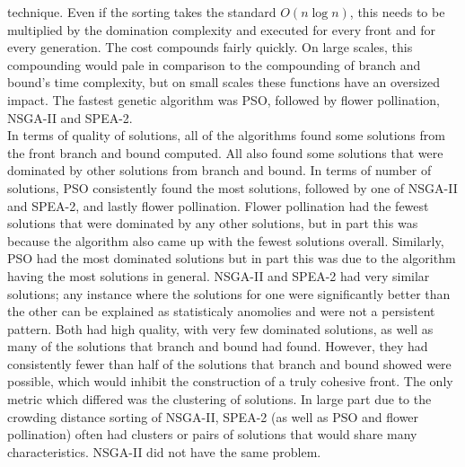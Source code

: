 \documentclass{article}
\begin{document}
    technique. Even if the sorting takes the standard \(O(n \log{n})\), this needs to be multiplied by the domination complexity and executed for every front and for 
    every generation. The cost compounds fairly quickly. On large scales, this compounding would pale in comparison to the compounding of branch and bound's time
    complexity, but on small scales these functions have an oversized impact. The fastest genetic algorithm was PSO, followed by flower pollination, NSGA-II and SPEA-2.\\
    In terms of quality of solutions, all of the algorithms found some solutions from the front branch and bound computed. All also found some solutions that were 
    dominated by other solutions from branch and bound. In terms of number of solutions, PSO consistently found the most solutions, followed by one of NSGA-II and
    SPEA-2, and lastly flower pollination. Flower pollination had the fewest solutions that were dominated by any other solutions, but in part this was because the
    algorithm also came up with the fewest solutions overall. Similarly, PSO had the most dominated solutions but in part this was due to the algorithm having the 
    most solutions in general. NSGA-II and SPEA-2 had very similar solutions; any instance where the solutions for one were significantly better than the other 
    can be explained as statisticaly anomolies and were not a persistent pattern. Both had high quality, with very few dominated solutions, as well as many of 
    the solutions that branch and bound had found. However, they had consistently fewer than half of the solutions that branch and bound showed were possible, 
    which would inhibit the construction of a truly cohesive front. The only metric which differed was the clustering of solutions. In large part due to the crowding
    distance sorting of NSGA-II, SPEA-2 (as well as PSO and flower pollination) often had clusters or pairs of solutions that would share many characteristics. 
    NSGA-II did not have the same problem. 
\end{document}
